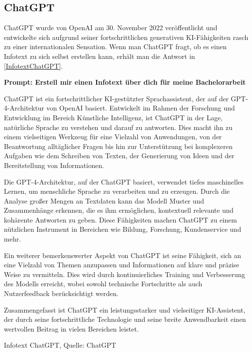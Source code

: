 \subsection{ChatGPT}  \label{ChatGPT}


ChatGPT wurde von OpenAI am 30. November 2022 veröffentlicht und entwickelte sich aufgrund seiner fortschrittlichen 
generativen KI-Fähigkeiten rasch zu einer internationalen Sensation. Wenn man ChatGPT fragt, ob es einen Infotext 
zu sich selbst erstellen kann, erhält man die Antwort in \autoref{InfotextChatGPT}.

\begin{prompt}
    \begin{tcolorbox}[colback=gray!20, colframe=gray!20, boxrule=0pt, sharp corners] 
    \textbf{Prompt: Erstell mir einen Infotext über dich für meine Bachelorarbeit}

    ChatGPT ist ein fortschrittlicher KI-gestützter Sprachassistent, der auf der GPT-4-Architektur von OpenAI basiert. 
    Entwickelt im Rahmen der Forschung und Entwicklung im Bereich Künstliche Intelligenz, ist ChatGPT in der Lage, 
    natürliche Sprache zu verstehen und darauf zu antworten. Dies macht ihn zu einem vielseitigen Werkzeug für eine 
    Vielzahl von Anwendungen, von der Beantwortung alltäglicher Fragen bis hin zur Unterstützung bei komplexeren 
    Aufgaben wie dem Schreiben von Texten, der Generierung von Ideen und der Bereitstellung von Informationen.
    
    Die GPT-4-Architektur, auf der ChatGPT basiert, verwendet tiefes maschinelles Lernen, um menschliche Sprache zu 
    verarbeiten und zu erzeugen. Durch die Analyse großer Mengen an Textdaten kann das Modell Muster und Zusammenhänge 
    erkennen, die es ihm ermöglichen, kontextuell relevante und kohärente Antworten zu geben. Diese Fähigkeiten machen 
    ChatGPT zu einem nützlichen Instrument in Bereichen wie Bildung, Forschung, Kundenservice und mehr.
    
    Ein weiterer bemerkenswerter Aspekt von ChatGPT ist seine Fähigkeit, sich an eine Vielzahl von Themen anzupassen 
    und Informationen auf klare und präzise Weise zu vermitteln. Dies wird durch kontinuierliches Training und 
    Verbesserung des Modells erreicht, wobei sowohl technische Fortschritte als auch Nutzerfeedback berücksichtigt 
    werden.
    
    Zusammengefasst ist ChatGPT ein leistungsstarker und vielseitiger KI-Assistent, der durch seine fortschrittliche 
    Technologie und seine breite Anwendbarkeit einen wertvollen Beitrag in vielen Bereichen leistet.
    \vfill
    \end{tcolorbox}
    \caption{Infotext ChatGPT, Quelle: ChatGPT}
    \label{InfotextChatGPT}
\end{prompt}

